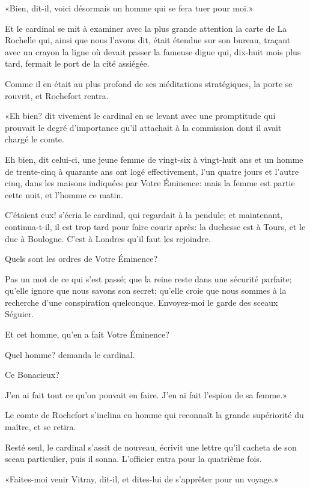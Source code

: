 «Bien, dit-il, voici désormais un homme qui se fera tuer pour moi.» 

Et le cardinal se mit à examiner avec la plus grande attention la carte de La Rochelle qui, ainsi que nous l'avons dit, était étendue sur son bureau, traçant avec un crayon la ligne où devait passer la fameuse digue qui, dix-huit mois plus tard, fermait le port de la cité assiégée. 

Comme il en était au plus profond de ses méditations stratégiques, la porte se rouvrit, et Rochefort rentra. 

«Eh bien? dit vivement le cardinal en se levant avec une promptitude qui prouvait le degré d'importance qu'il attachait à la commission dont il avait chargé le comte. 

\speak  Eh bien, dit celui-ci, une jeune femme de vingt-six à vingt-huit ans et un homme de trente-cinq à quarante ans ont logé effectivement, l'un quatre jours et l'autre cinq, dans les maisons indiquées par Votre Éminence: mais la femme est partie cette nuit, et l'homme ce matin. 

\speak  C'étaient eux! s'écria le cardinal, qui regardait à la pendule; et maintenant, continua-t-il, il est trop tard pour faire courir après: la duchesse est à Tours, et le duc à Boulogne. C'est à Londres qu'il faut les rejoindre. 

\speak  Quels sont les ordres de Votre Éminence? 

\speak  Pas un mot de ce qui s'est passé; que la reine reste dans une sécurité parfaite; qu'elle ignore que nous savons son secret; qu'elle croie que nous sommes à la recherche d'une conspiration quelconque. Envoyez-moi le garde des sceaux Séguier. 

\speak  Et cet homme, qu'en a fait Votre Éminence? 

\speak  Quel homme? demanda le cardinal. 

\speak  Ce Bonacieux? 

\speak  J'en ai fait tout ce qu'on pouvait en faire. J'en ai fait l'espion de sa femme.» 

Le comte de Rochefort s'inclina en homme qui reconnaît la grande supériorité du maître, et se retira. 

Resté seul, le cardinal s'assit de nouveau, écrivit une lettre qu'il cacheta de son sceau particulier, puis il sonna. L'officier entra pour la quatrième fois. 

«Faites-moi venir Vitray, dit-il, et dites-lui de s'apprêter pour un voyage.» 

